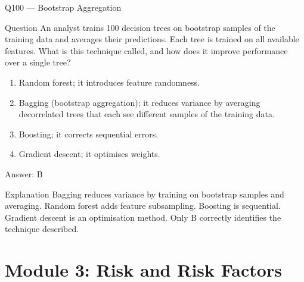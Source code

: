 \documentclass[aspectratio=169,8pt]{beamer}
\begin{document}
\begin{frame}{Q100 --- Bootstrap Aggregation}
\begin{block}{Question}
An analyst trains 100 decision trees on bootstrap samples of the training data and averages their predictions. Each tree is trained on all available features. What is this technique called, and how does it improve performance over a single tree?
\end{block}
\begin{enumerate}
\item Random forest; it introduces feature randomness.
\item Bagging (bootstrap aggregation); it reduces variance by averaging decorrelated trees that each see different samples of the training data.
\item Boosting; it corrects sequential errors.
\item Gradient descent; it optimises weights.
\end{enumerate}
\begin{exampleblock}{Answer: B}\end{exampleblock}
\begin{block}{Explanation}
Bagging reduces variance by training on bootstrap samples and averaging. Random forest adds feature subsampling. Boosting is sequential. Gradient descent is an optimisation method. Only B correctly identifies the technique described.
\end{block}
\end{frame}

\section{Module 3: Risk and Risk Factors}
\end{document}
